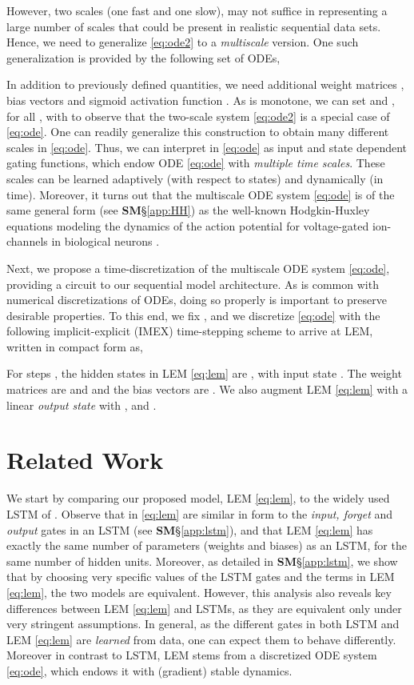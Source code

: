 \documentclass{article} \usepackage{iclr2022_conference,times}
\begin{document}
However, two scales (one fast and one slow), may not suffice in representing a large number of scales that could be present in realistic sequential data sets. Hence, we need to generalize \eqref{eq:ode2} to a \emph{multiscale} version. One such generalization is provided by the following set of ODEs,

In addition to previously defined quantities, we need additional weight matrices , bias vectors  and sigmoid activation function . 
As  is monotone, we can set  and , for all , with  to observe that the two-scale system \eqref{eq:ode2} is a special case of \eqref{eq:ode}. 
One can readily generalize this construction to obtain many different scales in \eqref{eq:ode}. 
Thus, we can interpret  in \eqref{eq:ode} as input and state dependent gating functions, which endow ODE \eqref{eq:ode} with \emph{multiple time scales}.
These scales can be learned adaptively (with respect to states) and dynamically (in time). Moreover, it turns out that the multiscale ODE system \eqref{eq:ode} is of the same general form (see {\bf SM}\S\ref{app:HH}) as the well-known Hodgkin-Huxley equations modeling the dynamics of the action potential for voltage-gated ion-channels in biological neurons \citep{HH}. 



Next, we propose a time-discretization of the multiscale ODE system \eqref{eq:ode}, providing a circuit to our sequential model architecture. As is common with numerical discretizations of ODEs, doing so properly is important to preserve desirable properties. 
To this end, we fix , and we discretize \eqref{eq:ode} with the following implicit-explicit (IMEX) time-stepping scheme to arrive at LEM, written in compact form as, 

For steps , the hidden states in LEM \eqref{eq:lem} are , with input state . The weight matrices are  and  and the bias vectors are . We also augment LEM \eqref{eq:lem} with a linear \emph{output state}  with , and .


\section{Related Work} 
\label{sxn:related}

We start by comparing our proposed model, LEM \eqref{eq:lem}, to the widely used LSTM of \citet{lstm}.
Observe that  in \eqref{eq:lem} are similar in form to the \emph{input, forget} and \emph{output} gates in an LSTM (see {\bf SM}\S\ref{app:lstm}), and that LEM \eqref{eq:lem} has exactly the same number of parameters (weights and biases) as an LSTM, for the same number of hidden units. 
Moreover, as detailed in {\bf SM}\S\ref{app:lstm}, we show that by choosing very specific values of the LSTM gates and the  terms in LEM \eqref{eq:lem}, the two models are equivalent. 
However, this analysis also reveals key differences between LEM \eqref{eq:lem} and LSTMs, as they are equivalent only under very stringent assumptions. 
In general, as the different gates in both LSTM and LEM \eqref{eq:lem} are \emph{learned} from data, one can expect them to behave differently. 
Moreover in contrast to LSTM, LEM stems from a discretized ODE system \eqref{eq:ode}, which endows it with (gradient) stable dynamics.  
\end{document}
